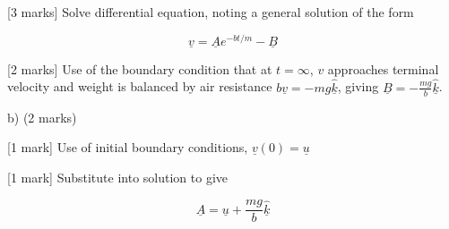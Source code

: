 \documentclass[a4paper,11pt]{article}
\begin{document}
[3 marks] Solve differential equation, noting a general solution of the form 

\[
\underline{v} = \underline{A} e^{-bt/m} - \underline{B}
\]

[2 marks] Use of the boundary condition that at \( t = \infty \),  \( v \) approaches terminal velocity and weight is balanced by air resistance \( b\underline{v} = - mg \hat{\underline{k}} \), giving \( \underline{B} = - \frac{mg}{b} \hat{\underline{k}} \).

b) (2 marks)

[1 mark] Use of initial boundary conditions, \( \underline{v}(0) = \underline{u} \)

[1 mark] Substitute into solution to give

\[ \underline{A} = \underline{u} + \frac{mg}{b} \hat{\underline{k}} \]
\end{document}
